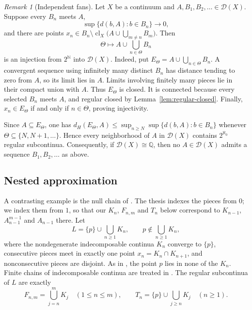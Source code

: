 \documentclass[11pt]{amsart}
\theoremstyle{definition}
\theoremstyle{remark}
\newtheorem{remark}[theorem]{Remark}
\newcommand{\clX}{\operatorname{cl}_X}
\newcommand{\D}{\mathcal{D}}
\newcommand{\N}{\mathbb{N}}
\newcommand{\Q}{\mathbb{Q}}
\newcommand{\dH}{d_H}
\begin{document}
\begin{remark}[Independent fans]\label{rem:fans}
Let $X$ be a continuum and $A,B_1,B_2,\ldots\in\D(X)$. Suppose every $B_n$ meets $A$,
\[
\sup\{d(b,A): b\in B_n\}\longrightarrow0,
\]
and there are points $x_n\in B_n\setminus\clX\bigl(A\cup\bigcup_{m\neq n}B_m\bigr)$. Then
\[
\Theta\longmapsto A\cup\bigcup_{n\in\Theta}B_n
\]
is an injection from $2^\N$ into $\D(X)$. Indeed, put $E_\Theta=A\cup\bigcup_{n\in\Theta}B_n$. A convergent sequence using infinitely many distinct $B_n$ has distance tending to zero from $A$, so its limit lies in $A$. Limits involving finitely many pieces lie in their compact union with $A$. Thus $E_\Theta$ is closed. It is connected because every selected $B_n$ meets $A$, and regular closed by Lemma~\ref{lem:regular-closed}. Finally, $x_n\in E_\Theta$ if and only if $n\in\Theta$, proving injectivity.

Since $A\subseteq E_\Theta$, one has $\dH(E_\Theta,A)\le\sup_{n\ge N}\sup\{d(b,A):b\in B_n\}$ whenever $\Theta\subseteq\{N,N+1,\ldots\}$. Hence every neighborhood of $A$ in $\D(X)$ contains $2^{\aleph_0}$ regular subcontinua. Consequently, if $\D(X)\cong\Q$, then no $A\in\D(X)$ admits a sequence $B_1,B_2,\ldots$ as above.
\end{remark}

\subsection{Nested approximation}\label{subsec:nested}
A contrasting example is the null chain of \cite[Ejemplo~3.2.1]{Ra}. The thesis indexes the pieces from $0$; we index them from $1$, so that our $K_n$, $F_{n,m}$ and $T_n$ below correspond to $K_{n-1}$, $A^{m-1}_{n-1}$ and $A_{n-1}$ there. Let
\[
L=\{p\}\cup\bigcup_{n\ge1}K_n,\qquad p\notin\bigcup_{n\ge1}K_n,
\]
where the nondegenerate indecomposable continua $K_n$ converge to $\{p\}$, consecutive pieces meet in exactly one point $x_n=K_n\cap K_{n+1}$, and nonconsecutive pieces are disjoint. As in \cite[Figura~3.1]{Ra}, the point $p$ lies in none of the $K_n$. Finite chains of indecomposable continua are treated in \cite[Proposition~4.15(1)]{Or18}. The regular subcontinua of $L$ are exactly
\[
F_{n,m}=\bigcup_{j=n}^mK_j\quad(1\le n\le m),\qquad T_n=\{p\}\cup\bigcup_{j\ge n}K_j\quad(n\ge1).
\]
\end{document}
